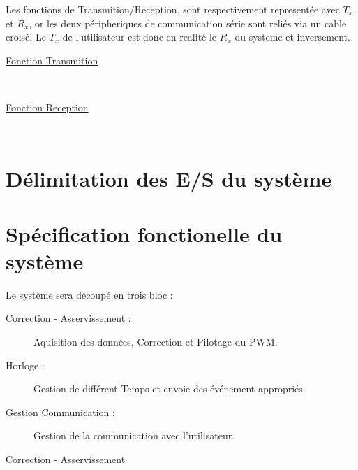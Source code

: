 \documentclass[11pt, french]{article} %
\begin{document}
\newpage

Les fonctions de Transmition/Reception, sont respectivement representée avec $T_x$ et $R_x$, or les deux péripheriques de communication série sont reliés via un cable croisé. Le $T_x$ de l'utilisateur est donc en realité le $R_x$ du systeme et inversement.

\begin{minipage}[t, h]{5cm}
\hspace{0.2in}
\underline{Fonction Transmition}
\end{minipage}
~
\begin{minipage}[t, h]{9cm}

\end{minipage}

\begin{minipage}[t, h]{5cm}
\hspace{0.2in}
\underline{Fonction Reception}
\end{minipage}
~
\begin{minipage}[t, h]{9cm}

\end{minipage}

\section{Délimitation des E/S du système}



\section{Spécification fonctionelle du système}

Le système sera découpé en trois bloc :
\vspace{0.1in}
\begin{description}
\item[Correction - Asservissement : ] Aquisition des données, Correction et Pilotage du PWM.
\item[Horloge : ] Gestion de différent Temps et envoie des événement appropriés.
\item[Gestion Communication : ] Gestion de la communication avec l'utilisateur.
\end{description}

\vspace{0.2in}
\underline{Correction - Asservissement}

\begin{center}

\end{center}
\end{document}
